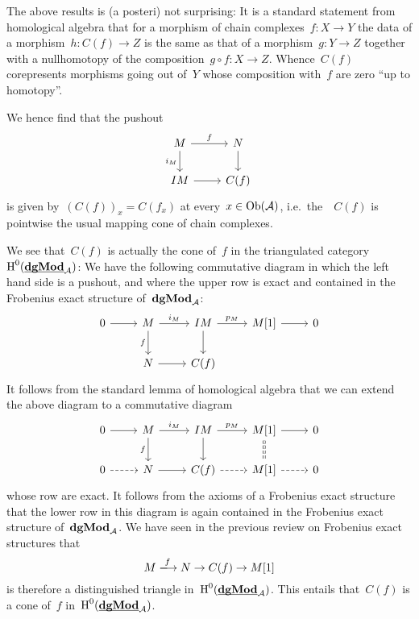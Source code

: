 \documentclass[a4paper,10pt]{scrartcl}
\begin{document}
\begin{remark}
  The above results is (a posteri) not surprising:
  It is a standard statement from homological algebra that for a morphism of chain complexes~$f \colon X \to Y$ the data of a morphism~$h \colon C(f) \to Z$ is the same as that of a morphism~$g \colon Y \to Z$ together with a nullhomotopy of the composition~$g \circ f \colon X \to Z$.
  Whence~$C(f)$ corepresents morphisms going out of~$Y$ whose composition with~$f$ are zero \enquote{up to homotopy}.
\end{remark}

We hence find that the pushout
\[
  \begin{tikzcd}
    M
    \arrow{r}[above]{f}
    \arrow{d}[left]{i_M}
    &
    N
    \arrow{d}
    \\
    IM
    \arrow{r}
    &
    C(f)
  \end{tikzcd}
\]
is given by~$(C(f))_x = C(f_x)$ at every~$x \in \operatorname{Ob}(\mathcal{A})$, i.e.\ the~{\dgmodule{$\Acat$}}~$C(f)$ is pointwise the usual mapping cone of chain complexes.

We see that~$C(f)$ is actually the cone of~$f$ in the triangulated category~$\operatorname{H}^0(\underline{\smash{\mathbf{dgMod}}}_{\mathcal{A}})$:
We have the following commutative diagram in which the left hand side is a pushout, and where the upper row is exact and contained in the Frobenius exact structure of~$\mathbf{dgMod}_{\mathcal{A}}$:
\[
  \begin{tikzcd}
    0
    \arrow{r}
    &
    M
    \arrow{r}[above]{i_M}
    \arrow{d}[left]{f}
    &
    IM
    \arrow{r}[above]{p_M}
    \arrow{d}
    &
    M[1]
    \arrow{r}
    &
    0
    \\
    {}
    &
    N
    \arrow{r}
    &
    C(f)
    &
    {}
    &
    {}
  \end{tikzcd}
\]
It follows from the standard lemma of homological algebra that we can extend the above diagram to a commutative diagram
\[
  \begin{tikzcd}
    0
    \arrow{r}
    &
    M
    \arrow{r}[above]{i_M}
    \arrow{d}[left]{f}
    &
    IM
    \arrow{r}[above]{p_M}
    \arrow{d}
    &
    M[1]
    \arrow{r}
    \arrow[dashed,equal]{d}
    &
    0
    \\
    0
    \arrow[dashed]{r}
    &
    N
    \arrow{r}
    &
    C(f)
    \arrow[dashed]{r}
    &
    M[1]
    \arrow[dashed]{r}
    &
    0
  \end{tikzcd}
\]
whose row are exact.
It follows from the axioms of a Frobenius exact structure that the lower row in this diagram is again contained in the Frobenius exact structure of~$\mathbf{dgMod}_{\mathcal{A}}$.
We have seen in the previous review on Frobenius exact structures that
\[
  M
  \xlongto{f}
  N
  \to
  C(f)
  \to
  M[1]
\]
is therefore a distinguished triangle in~$\operatorname{H}^0(\underline{\smash{\mathbf{dgMod}}}_{\mathcal{A}})$.
This entails that~$C(f)$ is a cone of~$f$ in~$\operatorname{H}^0(\underline{\smash{\mathbf{dgMod}}}_{\mathcal{A}})$.
\end{document}
